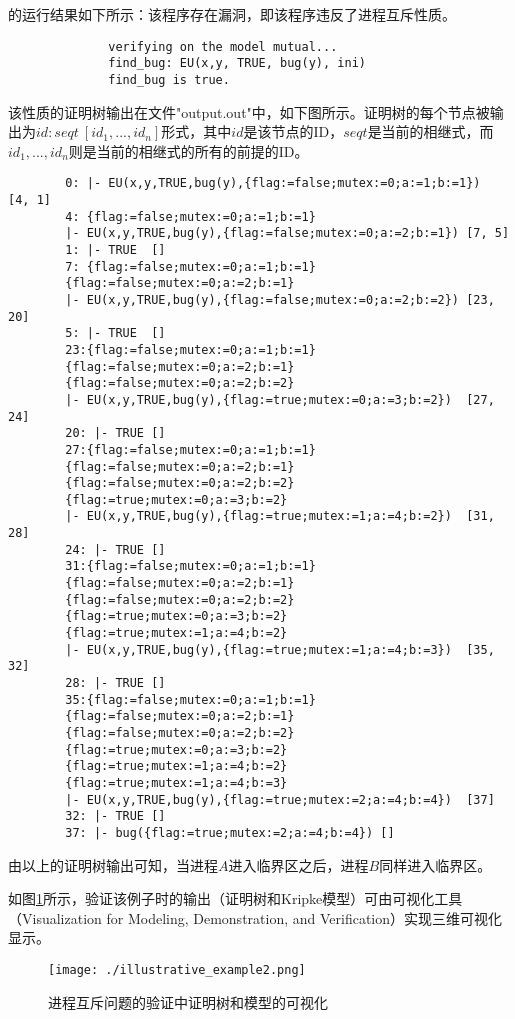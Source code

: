 \begin{example}[进程互斥问题\cite{Peterson81}]
	\sctlprov{}的运行结果如下所示：该程序存在漏洞，即该程序违反了进程互斥性质。
	\begin{center}
		\small
		\begin{verbatim}
              verifying on the model mutual...
              find_bug: EU(x,y, TRUE, bug(y), ini)
              find_bug is true.
		\end{verbatim}
	\end{center}
	该性质的证明树输出在文件"output.out"中，如下图所示。证明树的每个节点被输出为${id: seqt ~ [id_1, ..., id_n]}$形式，其中$id$是该节点的ID，$seqt$是当前的相继式，而${id_1,...,id_n}$则是当前的相继式的所有的前提的ID。
	\begin{center}
		\small
		\begin{verbatim}
		0: |- EU(x,y,TRUE,bug(y),{flag:=false;mutex:=0;a:=1;b:=1})	[4, 1]
		4: {flag:=false;mutex:=0;a:=1;b:=1}
		|- EU(x,y,TRUE,bug(y),{flag:=false;mutex:=0;a:=2;b:=1})	[7, 5]
		1: |- TRUE	[]
		7: {flag:=false;mutex:=0;a:=1;b:=1} 
		{flag:=false;mutex:=0;a:=2;b:=1}
		|- EU(x,y,TRUE,bug(y),{flag:=false;mutex:=0;a:=2;b:=2})	[23, 20]
		5: |- TRUE	[]
		23:{flag:=false;mutex:=0;a:=1;b:=1} 
		{flag:=false;mutex:=0;a:=2;b:=1} 
		{flag:=false;mutex:=0;a:=2;b:=2}
		|- EU(x,y,TRUE,bug(y),{flag:=true;mutex:=0;a:=3;b:=2})	[27, 24]
		20: |- TRUE	[]
		27:{flag:=false;mutex:=0;a:=1;b:=1} 
		{flag:=false;mutex:=0;a:=2;b:=1} 
		{flag:=false;mutex:=0;a:=2;b:=2} 
		{flag:=true;mutex:=0;a:=3;b:=2}
		|- EU(x,y,TRUE,bug(y),{flag:=true;mutex:=1;a:=4;b:=2})	[31, 28]
		24: |- TRUE	[]
		31:{flag:=false;mutex:=0;a:=1;b:=1} 
		{flag:=false;mutex:=0;a:=2;b:=1} 
		{flag:=false;mutex:=0;a:=2;b:=2} 
		{flag:=true;mutex:=0;a:=3;b:=2} 
		{flag:=true;mutex:=1;a:=4;b:=2}
		|- EU(x,y,TRUE,bug(y),{flag:=true;mutex:=1;a:=4;b:=3})	[35, 32]
		28: |- TRUE	[]
		35:{flag:=false;mutex:=0;a:=1;b:=1} 
		{flag:=false;mutex:=0;a:=2;b:=1} 
		{flag:=false;mutex:=0;a:=2;b:=2} 
		{flag:=true;mutex:=0;a:=3;b:=2} 
		{flag:=true;mutex:=1;a:=4;b:=2} 
		{flag:=true;mutex:=1;a:=4;b:=3}
		|- EU(x,y,TRUE,bug(y),{flag:=true;mutex:=2;a:=4;b:=4})	[37]
		32: |- TRUE	[]
		37: |- bug({flag:=true;mutex:=2;a:=4;b:=4})	[]
		\end{verbatim}
	\end{center}
	由以上的证明树输出可知，当进程$A$进入临界区之后，进程$B$同样进入临界区。
	
	如图\ref{fig:visualize:illustrative}所示，\sctlprov{}验证该例子时的输出（证明树和Kripke模型）可由可视化工具（Visualization for Modeling, Demonstration, and Verification）实现三维可视化显示。
	\begin{figure}[!h]
		\centering
		\texttt{[image: ./illustrative\_example2.png]}
		\caption{进程互斥问题的验证中证明树和模型的可视化}
		\label{fig:visualize:illustrative}
	\end{figure}
	

\end{example}
